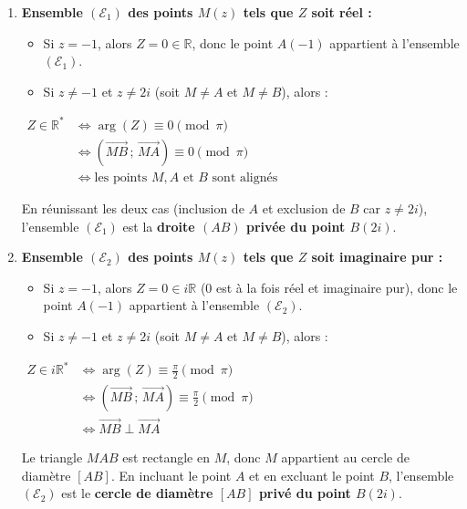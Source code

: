 \documentclass[12pt,a4paper]{article}
\begin{document}
\begin{enumerate}
    \item \textbf{Ensemble $(\mathcal{E}_1)$ des points $M(z)$ tels que $Z$ soit réel :}
    
    \begin{itemize}
        \item Si $z = -1$, alors $Z = 0 \in \mathbb{R}$, donc le point $A(-1)$ appartient à l'ensemble $(\mathcal{E}_1)$.
        \item Si $z \neq -1$ et $z \neq 2i$ (soit $M \neq A$ et $M \neq B$), alors :
    \end{itemize}
    
    $
    \begin{aligned}
        Z \in \mathbb{R}^* &\iff \arg(Z) \equiv 0 \pmod{\pi}\\
        &\iff \left(\overrightarrow{MB}\,;\,\overrightarrow{MA}\right) \equiv 0 \pmod{\pi}\\
        &\iff \text{les points } M, A \text{ et } B \text{ sont alignés}
    \end{aligned}
    $
    
    En réunissant les deux cas (inclusion de $A$ et exclusion de $B$ car $z \neq 2i$), l'ensemble $(\mathcal{E}_1)$ est la \textbf{droite $(AB)$ privée du point $B(2i)$}.

    \item \textbf{Ensemble $(\mathcal{E}_2)$ des points $M(z)$ tels que $Z$ soit imaginaire pur :}
    
    \begin{itemize}
        \item Si $z = -1$, alors $Z = 0 \in i\mathbb{R}$ ($0$ est à la fois réel et imaginaire pur), donc le point $A(-1)$ appartient à l'ensemble $(\mathcal{E}_2)$.
        \item Si $z \neq -1$ et $z \neq 2i$ (soit $M \neq A$ et $M \neq B$), alors :
    \end{itemize}
    
    $
    \begin{aligned}
        Z \in i\mathbb{R}^* &\iff \arg(Z) \equiv \frac{\pi}{2} \pmod{\pi}\\
        &\iff \left(\overrightarrow{MB}\,;\,\overrightarrow{MA}\right) \equiv \frac{\pi}{2} \pmod{\pi}\\
        &\iff \overrightarrow{MB} \perp \overrightarrow{MA}
    \end{aligned}
    $
    
    Le triangle $MAB$ est rectangle en $M$, donc $M$ appartient au cercle de diamètre $[AB]$. En incluant le point $A$ et en excluant le point $B$, l'ensemble $(\mathcal{E}_2)$ est le \textbf{cercle de diamètre $[AB]$ privé du point $B(2i)$}.


\end{enumerate}
\end{document}
